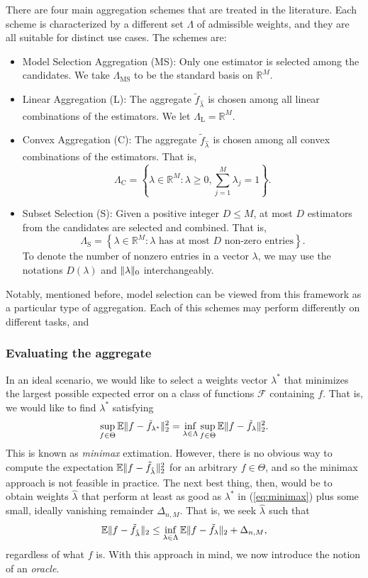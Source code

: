 \documentclass[11pt, letter paper]{article}
\newcommand{\1}{\mathmybb{1}}
\newcommand{\R}{\mathbb{R}}
\newcommand{\0}{\emptyset}
\newcommand{\E}{\mathbb{E}}
\newcommand{\set}[1]{\left\{ #1 \right\}}
\newcommand{\norm}[1]{|\hspace{-1pt}|#1 |\hspace{-1pt}|}
\newcommand{\normsq}[1]{\norm{#1}^{2}}
\newcommand{\Fcal}{\mathcal{F}}
\newcommand{\ftilde}[1]{\tilde{f}_{#1}}
\newcommand{\lambdahat}[1]{\hat{\lambda}_{#1}}
\begin{document}
There are four main aggregation schemes that are treated in the literature. Each scheme is characterized by a different set \(\Lambda\) of admissible weights, and they are all suitable for distinct use cases. The schemes are:
\begin{itemize}
    \item Model Selection Aggregation (MS): Only one estimator is selected among the candidates. We take \(\Lambda_{\mathrm{MS}}\) to be the standard basis on \(\R^{M}\).
    \item Linear Aggregation (L): The aggregate \(\ftilde{\lambdahat{}}\) is chosen among all linear combinations of the estimators. We let \(\Lambda_{\mathrm{L}} = \R^{M}\).
    \item Convex Aggregation (C): The aggregate \(\ftilde{\lambdahat{}}\) is chosen among all convex combinations of the estimators. That is, \[\Lambda_{\mathrm{C}} = \set{\lambda\in\R^{M}:\lambda\geq 0, \sum_{j=1}^{M}\lambda_{j} = 1}.\]
    \item Subset Selection (S): Given a positive integer \(D\leq M\), at most \(D\) estimators from the candidates are selected and combined. That is, \[\Lambda_{\mathrm{S}} = \set{\lambda\in\R^{M}:\lambda\text{ has at most \(D\) non-zero entries}}.\]
    To denote the number of nonzero entries in a vector \(\lambda\), we may use the notations \(D(\lambda)\) and \(\norm{\lambda}_{0}\) interchangeably.
\end{itemize}

Notably, mentioned before, model selection can be viewed from this framework as a particular type of aggregation. Each of this schemes may perform differently on different tasks, and 

\subsubsection{Evaluating the aggregate}

In an ideal scenario, we would like to select a weights vector \(\lambda^*\) that minimizes the largest possible expected error on a class of functions \(\Fcal\) containing \(f\). That is, we would like to find \(\lambda^*\) satisfying 
\begin{equation}\label{eq:minimax}
    \sup_{f\in\Theta}\E\normsq{f-\ftilde{\lambda^*}}_{2} = \inf_{\lambda\in\Lambda}\sup_{f\in\Theta}\E\normsq{f-\ftilde{\lambda}}_{2}.
\end{equation}
This is known as \emph{minimax} extimation. 
However, there is no obvious way to compute the expectation \(\E\normsq{f-\ftilde{\lambdahat{}}}_{2}\) for an arbitrary \(f\in\Theta\), and so the minimax approach is not feasible in practice. The next best thing, then, would be to obtain weights \(\lambdahat{}\) that perform at least as good as \(\lambda^*\) in (\ref{eq:minimax}) plus some small, ideally vanishing remainder \(\Delta_{n,M}\). That is, we seek \(\lambdahat{}\) such that
\begin{equation}\label{eq:oracleineq}
    \E\norm{f - \ftilde{\lambdahat{}}}_{2} \leq \inf_{\lambda\in\Lambda}\E\norm{f - \ftilde{\lambda}}_{2} + \Delta_{n,M},
\end{equation}
regardless of what \(f\) is. With this approach in mind, we now introduce the notion of an \emph{oracle}.
\end{document}
